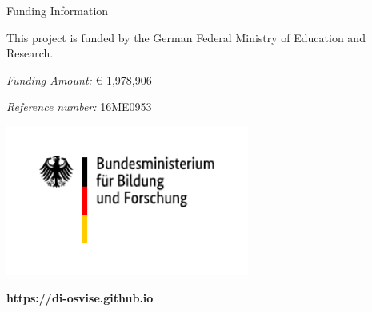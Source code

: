 \documentclass[portrait,a0]{a0poster}
\newcommand{\mainbox}[3]{
    \begin{mdframed}[style=mainbox]
        \begin{center}
            \vspace{5mm}
            {\extrabold \Huge #1}
        \end{center}
        \vspace{5mm}
        \parbox[t][#2][t]{\linewidth}{\large
            #3
        }
    \end{mdframed}
}
\begin{document}
%
\hfill
%
\begin{minipage}[t]{272mm}
    \mainbox{Funding Information}{13cm}{
        This project is funded by the German Federal Ministry of Education and Research.
        
        \medskip

        \emph{Funding Amount:} € 1,978,906
        
        \emph{Reference number:} 16ME0953

        \vfill

        \centering
            
            \includegraphics[width=0.6\textwidth]{BMBF_Logo}

    }
    \raggedleft \Large \color{ciblue} \textbf{https://di-osvise.github.io}
\end{minipage}
\end{document}
